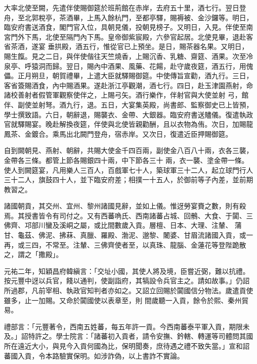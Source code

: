 \begin{pinyinscope}
 大率北使至闕，先遣伴使賜御筵於班荊館在赤岸，去府五十里，酒七行。翌日登舟，至北郭稅亭，茶酒畢，上馬入餘杭門，至都亭驛，賜褥被、金沙鑼等。明日，臨安府書送酒食，閣門官入位，具朝見儀，投朝見榜子。又明日，入見。伴使至南宮門外下馬，北使至隔門內下馬。皇帝御紫宸殿，六參官起居。北使見畢，退赴客省茶酒，遂宴
 垂拱殿，酒五行，惟從官已上預坐。是日，賜茶器名果。又明日，賜生餼。見之二日，與伴使偕往天竺燒香，上賜沉香、乳糖、齋筵、酒果。次至冷泉亭、呼猿洞而歸。翌日，賜內中酒果、風藥、花餳，赴守歲夜筵，酒五行，用傀儡。正月朔旦，朝賀禮畢，上遣大臣就驛賜御筵。中使傳旨宣勸，酒九行。三日，客省簽賜酒食，內中賜酒果。遂赴浙江亭觀潮，酒七行。四日，赴玉津園燕射，命諸校善射者假管軍觀察使伴之，上賜弓矢。酒行樂作，伴射官與大使並射
 弓，館伴、副使並射弩。酒九行，退。五日，大宴集英殿，尚書郎、監察御史已上皆預，學士撰致語。六日，朝辭退，賜襲衣、金帶、大銀器。臨安府書送贐儀。復遣執政官就驛賜宴。晚赴解換夜筵，伴使與北使皆親勸酬，且以衣物為侑。次日，加賜龍鳳茶、金鍍合。乘馬出北闕門登舟，宿赤岸。又次日，復遣近臣押賜御筵。



 自到闕朝見、燕射、朝辭，共賜大使金千四百兩，副使金八百八十兩，衣各三襲，金帶各三條。都管上節各賜銀四十兩，中下節各三十
 兩，衣一襲、塗金帶一條。使人到闕筵宴，凡用樂人三百人，百戲軍七十人，築球軍三十二人，起立球門行人三十二人，旗鼓四十人，並下臨安府差；相撲一十五人，於御前等子內差，並前期教習之。



 諸國朝貢，其交州、宜州、黎州諸國見辭，並如上儀。惟迓勞宴賚之數，則有殺焉。其授書皆令有司付之。又有西蕃唃氏、西南諸蕃占城、回鶻、大食、于闐、三佛齊、邛部川蠻及溪峒之屬，或比間數歲入貢。層檀、日本、大理、注輦、
 蒲甘、龜茲、佛泥、拂菻、真臘、羅殿、渤泥、邈黎、闍婆、甘眉流諸國入貢，或一再，或三四，不常至。注輦、三佛齊使者至，以真珠、龍腦、金蓮花等登陛跪散之，謂之「撒殿」。



 元祐二年，知穎昌府韓縝言：「交址小國，其使人將及境，臣嘗近弼，難以抗禮。按元豐中迓以兵官，餞以通判，使副詣府，其犒設令兵官主之。請如故事。」仍詔所過郡，凡前宰相、執政官知判者亦如之。又詔立回賜於闐國信分物法。歲遣貢使雖多，止一加賜。又命於闐國使以表章至，則
 間歲聽一入貢，餘令於熙、秦州貿易。



 禮部言：「元豐著令，西南五姓蕃，每五年許一貢。今西南蕃泰平軍入貢，期限未及。」詔特許之。學士院言：「諸蕃初入貢者，請令安撫、鈐轄、轉運等司體問其國所在遠近大小，與見今入貢何國為比，保明聞奏，庶待遇之禮不致失當。」宣和詔蕃國入貢，令本路驗實保明。如涉詐偽，以上書詐不實論。




\end{pinyinscope}
